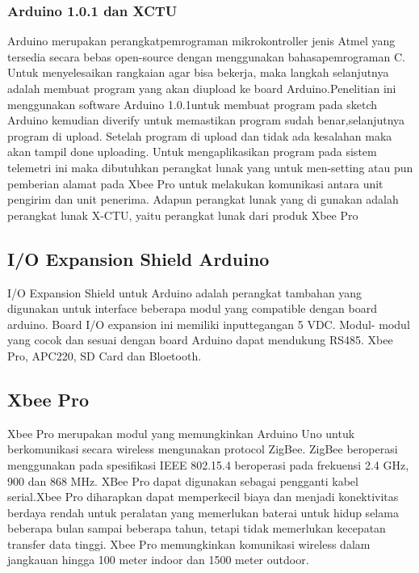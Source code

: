 \subsubsection {Arduino 1.0.1 dan XCTU}

Arduino merupakan perangkatpemrograman mikrokontroller jenis Atmel yang tersedia secara bebas open-source
dengan menggunakan bahasapemrograman C. Untuk menyelesaikan rangkaian agar bisa bekerja, maka langkah selanjutnya adalah membuat program yang
akan diupload ke board Arduino.Penelitian ini menggunakan software Arduino 1.0.1untuk membuat program pada sketch Arduino kemudian diverify
untuk memastikan program sudah benar,selanjutnya program di upload. Setelah program di upload dan tidak ada kesalahan
maka akan tampil done uploading. Untuk mengaplikasikan program pada sistem telemetri ini maka dibutuhkan perangkat lunak yang untuk men-setting atau pun pemberian alamat pada Xbee Pro untuk melakukan komunikasi antara unit pengirim dan unit penerima. Adapun
perangkat lunak yang di gunakan adalah perangkat lunak X-CTU, yaitu perangkat lunak dari produk Xbee Pro

\subsection  {I/O Expansion Shield Arduino}
I/O Expansion Shield untuk Arduino adalah perangkat tambahan yang digunakan untuk interface beberapa modul yang compatible dengan board arduino. Board I/O expansion ini memiliki inputtegangan 5 VDC. Modul- modul yang cocok dan sesuai dengan board Arduino dapat mendukung RS485. Xbee Pro, APC220, SD Card dan Bloetooth.

\subsection {Xbee Pro}
Xbee Pro merupakan modul yang memungkinkan Arduino Uno untuk berkomunikasi secara wireless
mengunakan protocol ZigBee. ZigBee beroperasi menggunakan pada spesifikasi IEEE 802.15.4 beroperasi pada frekuensi
2.4 GHz, 900 dan 868 MHz. XBee Pro dapat digunakan sebagai pengganti kabel serial.Xbee Pro diharapkan dapat memperkecil biaya dan menjadi
konektivitas berdaya rendah untuk peralatan yang memerlukan baterai untuk hidup selama beberapa bulan sampai beberapa tahun, tetapi tidak memerlukan kecepatan transfer data tinggi. Xbee Pro memungkinkan komunikasi wireless dalam jangkauan hingga 100 meter indoor dan 1500 meter outdoor.

